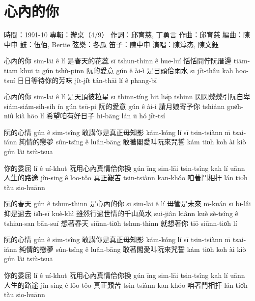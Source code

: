 \documentclass[UTF8,a4paper,oneside,twocolumn,12pt]{ctexbook}
\newcommand{\infopair}[2]{\textbullet #1：#2}
\newcommand{\zc}[1][伍佰]{\infopair{作詞}{#1}}
\newcommand{\zq}[1][伍佰]{\infopair{作曲}{#1}}
\newcommand{\bq}[1][伍佰]{\infopair{編曲}{#1}}
\newcommand{\zj}[1]{\infopair{專輯}{#1}}
\newcommand{\sj}[1]{\infopair{時間}{#1}}
\newenvironment{info}{\begin{flushleft}\kaishu
	}
	{\end{flushleft}\normalsize\yahei\par}
\newenvironment{lyric}{
	}
{}
\begin{document}
\section{心內的你}
\begin{info}
	\sj{1991-10}
	\zj{辦桌（4/9）}
	\zc[邱育慈, 丁勇言]
	\zq[邱育慈]
	\bq[陳中申]
	\infopair{鼓}{伍佰, Bertie}
	\infopair{弦樂}{冬瓜}
	\infopair{笛子}{陳中申}
	\infopair{演唱}{陳淳杰, 陳文鈺}
\end{info}
\begin{lyric}
	心內的你
	sim-lāi ê lí
	是春天的花蕊
	sī tshun-thinn ê hue-luí
	恬恬開佇阮厝邊
	tiām-tiām khui tī gún tshù-pinn
	阮的愛意
	gún ê ài-ì
	是日頭佮雨水
	sī ji̍t-thâu kah hōo-tsuí
	日日等待你的芳味
	ji̍t-ji̍t tán-thāi lí ê phang-bī

	心內的你
	sim-lāi ê lí
	是天頂彼粒星
	sī thinn-tíng hit lia̍p tshinn
	閃閃爍爍引阮自卑
	siám-siám-sih-sih ín gún tsū-pi
	阮的愛意
	gún ê ài-ì
	請月娘寄予你
	tshiánn gue̍h-niû kià hōo lí
	希望咱有好日子
	hi-bāng lán ū hó ji̍t-tsí

	阮的心情
	gún ê sim-tsîng
	敢講你是真正毋知影
	kám-kóng lí sī tsin-tsiànn m̄ tsai-iánn
	純情的戀夢
	sûn-tsîng ê luân-bāng
	敢著閣愛叫阮來咒誓
	kám tio̍h koh ài kiò gún lâi tsiù-tsuā

	你的委屈
	lí ê uí-khut
	阮用心內真情佮你換
	gún īng sim-lāi tsin-tsîng kah lí uānn
	人生的路途
	jîn-sing ê lōo-tôo
	真正艱苦
	tsin-tsiànn kan-khóo
	咱著鬥相扞
	lán tio̍h tàu sio-huānn

	阮的春天
	gún ê tshun-thinn
	是心內的你
	sī sim-lāi ê lí
	毋管是未來
	m̄-kuán sī bī-lâi
	抑是過去
	ia̍h-sī kuè-khì
	雖然行過世情的千山萬水
	sui-jiân kiânn kuè sè-tsîng ê tshian-san bān-suí
	想著春天
	siūnn-tio̍h tshun-thinn
	就想著你
	tiō siūnn-tio̍h lí

	阮的心情
	gún ê sim-tsîng
	敢講你是真正毋知影
	kám-kóng lí sī tsin-tsiànn m̄ tsai-iánn
	純情的戀夢
	sûn-tsîng ê luân-bāng
	敢著閣愛叫阮來咒誓
	kám tio̍h koh ài kiò gún lâi tsiù-tsuā

	你的委屈
	lí ê uí-khut
	阮用心內真情佮你換
	gún īng sim-lāi tsin-tsîng kah lí uānn
	人生的路途
	jîn-sing ê lōo-tôo
	真正艱苦
	tsin-tsiànn kan-khóo
	咱著鬥相扞
	lán tio̍h tàu sio-huānn
\end{lyric}
\end{document}
